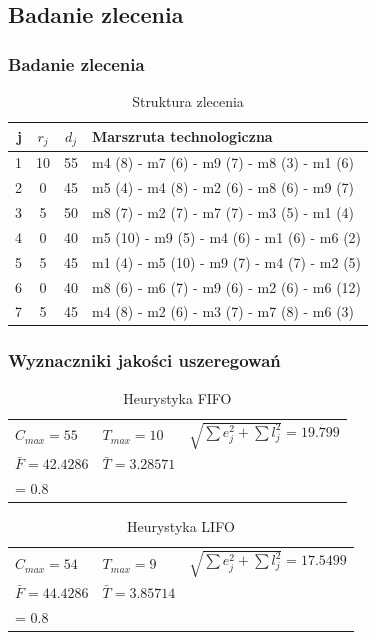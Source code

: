 \documentclass{prezentacja}
\begin{document}
\subsection     {Badanie zlecenia}
\label{sec:z1}
\begin{frame}
    \frametitle{Badanie zlecenia}
    \begin{table}[htb]
		\centering
		\caption{\large Struktura zlecenia}
		\begin{tabular}{ | r | c | c | l | }
		\hline
		j	& \(r_j\)	& \(d_j\)	& Marszruta technologiczna	\\ \hline
		1	& 10	& 55	& m4 (8) - m7 (6) - m9 (7) - m8 (3) - m1 (6)	\\ \hline
		2	& 0	& 45	& m5 (4) - m4 (8) - m2 (6) - m8 (6) - m9 (7)	\\ \hline
		3	& 5	& 50	& m8 (7) - m2 (7) - m7 (7) - m3 (5) - m1 (4)	\\ \hline
		4	& 0	& 40	& m5 (10) - m9 (5) - m4 (6) - m1 (6) - m6 (2)	\\ \hline
		5	& 5	& 45	& m1 (4) - m5 (10) - m9 (7) - m4 (7) - m2 (5)	\\ \hline
		6	& 0	& 40	& m8 (6) - m6 (7) - m9 (6) - m2 (6) - m6 (12)	\\ \hline
		7	& 5	& 45	& m4 (8) - m2 (6) - m3 (7) - m7 (8) - m6 (3)	\\ \hline
		\end{tabular}
	\end{table}
\end{frame}
\begin{frame}
    \frametitle{Wyznaczniki jakości uszeregowań}
    \begin{table}[htb]
        \caption{Heurystyka FIFO}
        \scriptsize
        \centering
        \begin{tabular}{ l l l }
            \(C_{max} = 55 \)	& \( T_{max} = 10 \)	& \( \sqrt{\sum e_j^2 + \sum l_j^2} = 19.799\)	\\
            \( \bar{F} = 42.4286 \)	& \( \bar{T} = 3.28571 \)	& \( \alpha*\sum e_j + \beta*\sum l_j \Big|_{\substack{\alpha = 0.2\\ \beta = 0.8}} = 22.6 \)	\\ 
        \end{tabular}
    \end{table}
	
    \begin{table}[htb]
        \caption{Heurystyka LIFO}
        \scriptsize
		\centering
		\begin{tabular}{ l l l }
		\(C_{max} = 54 \)	& \( T_{max} = 9 \)	& \( \sqrt{\sum e_j^2 + \sum l_j^2} = 17.5499\)	\\
		\( \bar{F} = 44.4286 \)	& \( \bar{T} = 3.85714 \)	& \( \alpha*\sum e_j + \beta*\sum l_j \Big|_{\substack{\alpha = 0.2\\ \beta = 0.8}} = 23.8 \)	\\ 
		\end{tabular}
	\end{table}
\end{frame}
\end{document}
